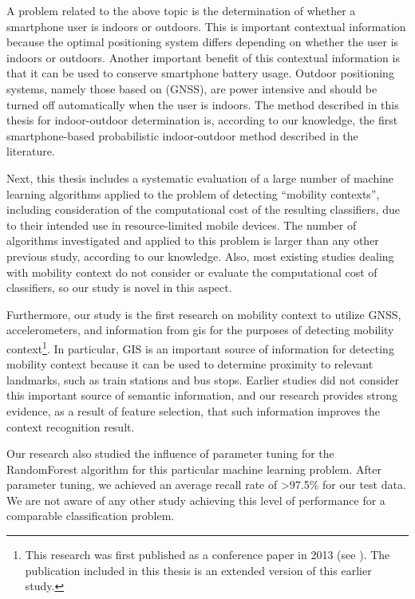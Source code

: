 A problem related to the above topic is the determination of whether a smartphone user is indoors or outdoors. This is important contextual information because the optimal positioning system differs depending on whether the user is indoors or outdoors. Another important benefit of this contextual information is that it can be used to conserve smartphone battery usage. Outdoor positioning systems, namely those based on  (GNSS), are power intensive and should be turned off automatically when the user is indoors. The method described in this thesis for indoor-outdoor determination is, according to our knowledge, the first smartphone-based probabilistic indoor-outdoor method described in the literature.

Next, this thesis includes a systematic evaluation of a large number of machine learning algorithms applied to the problem of detecting ``mobility contexts'', including consideration of the computational cost of the resulting classifiers, due to their intended use in resource-limited mobile devices. The number of algorithms investigated and applied to this problem is larger than any other previous study, according to our knowledge. Also, most existing studies dealing with mobility context do not consider or evaluate the computational cost of classifiers, so our study is novel in this aspect.

Furthermore, our study is the first research on mobility context to utilize GNSS, accelerometers, and information from \gls{gis} for the purposes of detecting mobility context\footnote{This research was first published as a conference paper in 2013 (see \cite{Guinness2013}). The publication included in this thesis is an extended version of this earlier study.}. In particular, GIS is an important source of information for detecting mobility context because it can be used to determine proximity to relevant landmarks, such as train stations and bus stops. Earlier studies did not consider this important source of semantic information, and our research provides strong evidence, as a result of feature selection, that such information improves the context recognition result.

Our research also studied the influence of parameter tuning for the RandomForest algorithm for this particular machine learning problem. After parameter tuning, we achieved an average recall rate of \textgreater97.5\% for our test data. We are not aware of any other study achieving this level of performance for a comparable classification problem.

